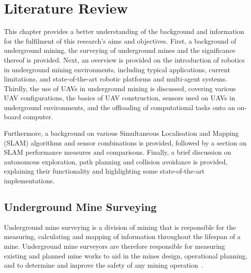\graphicspath{{LiteratureReview/LiteratureReviewFigures/}}

\chapter{Literature Review}
\label{chap:Literature Review}
This chapter provides a better understanding of the background and information for the fulfilment of this research’s aims and objectives. First, a background of underground mining, the surveying of underground mines and the significance thereof is provided. Next, an overview is provided on the introduction of robotics in underground mining environments, including typical applications, current limitations, and state-of-the-art robotic platforms and multi-agent systems. Thirdly, the use of UAVs in underground mining is discussed, covering various UAV configurations, the basics of UAV construction, sensors used on UAVs in underground environments, and the offloading of computational tasks onto an on-board computer. 

Furthermore, a background on various Simultaneous Localisation and Mapping (SLAM) algorithms and sensor combinations is provided, followed by a section on SLAM performance measures and comparisons. Finally, a brief discussion on autonomous exploration, path planning and collision avoidance is provided, explaining their functionality and highlighting some state-of-the-art implementations.

\section{Underground Mine Surveying}
Underground mine surveying is a division of mining that is responsible for the measuring, calculating and mapping of information throughout the lifespan of a mine. Underground mine surveyors are therefore responsible for measuring existing and planned mine works to aid in the mines design, operational planning, and to determine and improve the safety of any mining operation~\cite{LabourSafety, Peter2023}. 

